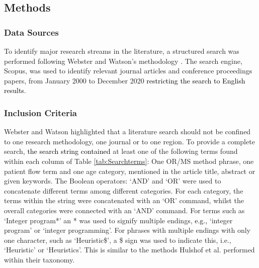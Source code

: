 \documentclass[../thesis.tex]{subfiles}
\begin{document}


\subsection{Methods} \label{sec:SC}
 
\subsubsection{Data Sources}
To identify major research streams in the literature, a structured search was performed following Webster and Watson's methodology \cite{Webster}. The search engine, Scopus, was used to identify relevant journal articles and conference proceeding\textcolor{black}{s} papers, from January 2000 to December 2020 \textcolor{black}{restricting the search to English results}.

\subsubsection{Inclusion Criteria}
Webster and Watson \cite{Webster} highlighted that a literature search should not be confined to one research methodology, one journal or to one region. To provide a complete search, \textcolor{black}{the search string contained} at least one of the following terms found within each column of Table \ref{tab:Searchterms}: One OR/MS method phrase, one patient flow term and one age category, mentioned in the article title, abstract or given keywords. The Boolean operators\textcolor{black}{:} `AND' and `OR' were used to concatenate different terms among different categories. For each category, the terms within the string were concatenated with an `OR' command, whilst the overall categories were connected with an `AND' command. For terms such as `Integer program*' an * was used to signify multiple endings, \textcolor{black}{e.g.,} `integer program' or `integer programming'. For phrases with multiple endings with only one character, such as `Heuristic\$', a \$ sign was used to indicate this, i.e., `Heuristic' or `Heuristics'. This is similar to the methods Hulshof et al. \cite{PHulshof} performed within their taxonomy. 
\end{document}
